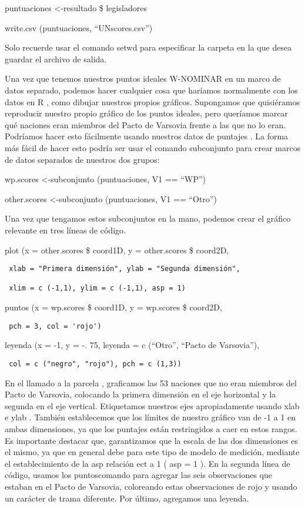 \documentclass[
]{book}
\begin{document}
puntuaciones \textless-resultado \$ legisladores

write.csv (puntuaciones, ``UNscores.csv'')

Solo recuerde usar el comando setwd para especificar la carpeta en la que desea guardar el archivo de salida.

Una vez que tenemos nuestros puntos ideales W-NOMINAR en un marco de datos separado, podemos hacer cualquier cosa que haríamos normalmente con los datos en R , como dibujar nuestros propios gráficos. Supongamos que quisiéramos reproducir nuestro propio gráfico de los puntos ideales, pero queríamos marcar qué naciones eran miembros del Pacto de Varsovia frente a las que no lo eran. Podríamos hacer esto fácilmente usando nuestros datos de puntajes . La forma más fácil de hacer esto podría ser usar el comando subconjunto para crear marcos de datos separados de nuestros dos grupos:

wp.scores \textless-subconjunto (puntuaciones, V1 == ``WP'')

other.scores \textless-subconjunto (puntuaciones, V1 == ``Otro'')

Una vez que tengamos estos subconjuntos en la mano, podemos crear el gráfico relevante en tres líneas de código.

plot (x = other.scores \$ coord1D, y = other.scores \$ coord2D,

\begin{verbatim}
 xlab = "Primera dimensión", ylab = "Segunda dimensión",

 xlim = c (-1,1), ylim = c (-1,1), asp = 1)
\end{verbatim}

puntos (x = wp.scores \$ coord1D, y = wp.scores \$ coord2D,

\begin{verbatim}
 pch = 3, col = 'rojo')
\end{verbatim}

leyenda (x = -1, y = -. 75, leyenda = c (``Otro'', ``Pacto de Varsovia''),

\begin{verbatim}
 col = c ("negro", "rojo"), pch = c (1,3))
\end{verbatim}

En el llamado a la parcela , graficamos las 53 naciones que no eran miembros del Pacto de Varsovia, colocando la primera dimensión en el eje horizontal y la segunda en el eje vertical. Etiquetamos nuestros ejes apropiadamente usando xlab e ylab . También establecemos que los límites de nuestro gráfico van de -1 a 1 en ambas dimensiones, ya que los puntajes están restringidos a caer en estos rangos. Es importante destacar que, garantizamos que la escala de las dos dimensiones es el mismo, ya que en general debe para este tipo de modelo de medición, mediante el establecimiento de la asp relación ect a 1 ( asp = 1 ). En la segunda línea de código, usamos los puntoscomando para agregar las seis observaciones que estaban en el Pacto de Varsovia, coloreando estas observaciones de rojo y usando un carácter de trama diferente. Por último, agregamos una leyenda.
\end{document}
